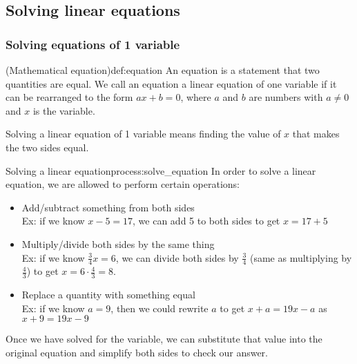 \documentclass{article}
\begin{document}
\setcounter{section}{2}
\setcounter{subsection}{1}

\subsection{Solving linear equations}

\subsubsection{Solving equations of 1 variable}

\begin{definition}{(Mathematical equation)}{def:equation}
    An equation is a statement that two quantities are equal. We call an equation a linear equation of one variable if it can be rearranged to the form $ax+b=0$, where $a$ and $b$ are numbers with $a\neq 0$ and $x$ is the variable.

    Solving a linear equation of 1 variable means finding the value of $x$ that makes the two sides equal.
\end{definition}

\begin{process}{Solving a linear equation}{process:solve_equation}
    In order to solve a linear equation, we are allowed to perform certain operations:
    \begin{itemize}
        \item Add/subtract something from both sides\\
        Ex: if we know $x-5=17$, we can add 5 to both sides to get $x=17+5$
        \item Multiply/divide both sides by the same thing\\
        Ex: if we know $\frac{3}{4}x=6$, we can divide both sides by $\frac{3}{4}$ (same as multiplying by $\frac{4}{3}$) to get $x=6\cdot\frac{4}{3}=8$.
        \item Replace a quantity with something equal\\
        Ex: if we know $a=9$, then we could rewrite $a$ to get $x+a=19x-a$ as $x+9=19x-9$
    \end{itemize}
    Once we have solved for the variable, we can substitute that value into the original equation and simplify both sides to check our answer.
\end{process}
\end{document}
